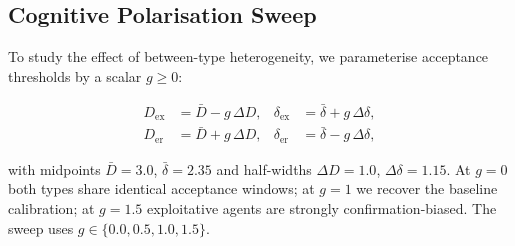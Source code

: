 \documentclass[pdflatex,sn-apa]{sn-jnl}%
\begin{document}
\subsection{Cognitive Polarisation Sweep}

To study the effect of between-type heterogeneity, we parameterise
acceptance thresholds by a scalar $g\ge 0$:

\begin{align}
  D_\mathrm{ex}   &= \bar D - g\,\Delta D, &
  \delta_\mathrm{ex} &= \bar\delta + g\,\Delta\delta,\\
  D_\mathrm{er}   &= \bar D + g\,\Delta D, &
  \delta_\mathrm{er} &= \bar\delta - g\,\Delta\delta,
\end{align}

with midpoints $\bar D = 3.0$, $\bar\delta = 2.35$ and half-widths
$\Delta D = 1.0$, $\Delta\delta = 1.15$.
At $g=0$ both types share identical acceptance windows; at $g=1$
we recover the baseline calibration; at $g=1.5$ exploitative agents
are strongly confirmation-biased.  The sweep uses
$g\in\{0.0, 0.5, 1.0, 1.5\}$.

\end{document}
